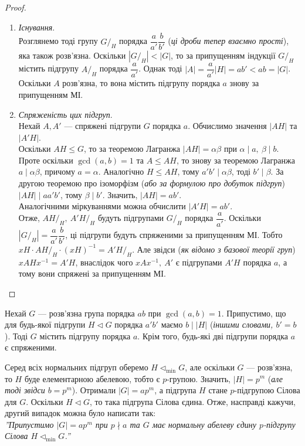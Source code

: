 \documentclass{math_library}
\begin{document}
\begin{proof}
\begin{enumerate}[topsep=0pt,wide=0pt,label={\roman*.}]
\item \textit{Існування}.\\
Розглянемо тоді групу $G/_H$ порядка $\dfrac{a}{a'} \dfrac{b}{b'}$ (\textit{ці дроби тепер взаємно прості}), яка також розв'язна. Оскільки $|G/_H| < |G|$, то за припущенням індукції $G/_H$ містить підгрупу $A/_H$ порядка $\dfrac{a}{a'}$. Однак тоді $|A| = \dfrac{a}{a'} |H| = ab' < ab = |G|$. Оскільки $A$ розв'язна, то вона містить підгрупу порядка $a$ знову за припущенням МІ.

\item \textit{Спряженість цих підгруп}.\\
Нехай $A,A'$ --- спряжені підгрупи $G$ порядка $a$. Обчислимо значення $|AH|$ та $|A'H|$.\\
Оскільки $AH \leq G$, то за теоремою Лагранжа $|AH| = \alpha \beta$ при $\alpha \mid a,\ \beta \mid b$. Проте оскільки $\gcd(a,b) = 1$ та $A \leq AH$, то знову за теоремою Лагранжа $a \mid \alpha \beta$, причому $a = \alpha$. Аналогічно $H \leq AH$, тому $a'b' \mid \alpha \beta$, тоді $b' \mid \beta$. За другою теоремою про ізоморфізм (\textit{або за формулою про добуток підгруп}) $|AH| \mid aa'b'$, тому $\beta \mid b'$. Значить, $|AH| = ab'$.\\
Аналогічними міркуваннями можна обчислити $|A'H| = ab'$.\\
Отже, $AH/_H,\ A'H/_H$ будуть підгрупами $G/_H$ порядка $\dfrac{a}{a'}$. Оскільки $|G/_H| = \dfrac{a}{a'} \dfrac{b}{b'}$, ці підгрупи будуть спряженими за припущенням МІ. Тобто $xH \cdot AH/_H \cdot (xH)^{-1} = A'H/_H$. Але звідси (\textit{як відомо з базової теорії груп}) $x AH x^{-1} = A'H$, внаслідок чого $xAx^{-1},\ A'$ є підгрупами $A'H$ порядка $a$, а тому вони спряжені за припущенням МІ. \qedhere
\end{enumerate}
\end{proof}

\begin{lemma}
Нехай $G$ --- розв'язна група порядка $ab$ при $\gcd(a,b) = 1$. Припустимо, що для будь-якої підгрупи $H \triangleleft G$ порядка $a'b'$ маємо $b \mid |H|$ (\textit{іншими словами, $b' = b$}). Тоді $G$ містить підгрупу порядка $a$. Крім того, будь-які дві підгрупи порядка $a$ є спряженими.
\end{lemma}

\begin{remark}
Серед всіх нормальних підгруп оберемо $H \triangleleft_{\text{min}} G$, але оскільки $G$ --- розв'язна, то $H$ буде елементарною абелевою, тобто є $p$-групою. Значить, $|H| = p^m$ (\textit{але тоді звідси $b = p^m$}). Отримали $|G| = ap^m$, а підгрупа $H$ стане $p$-підгрупою Сілова для $G$. Оскільки $H \triangleleft G$, то така підгрупа Сілова єдина. Отже, насправді кажучи, другий випадок можна було написати так:\\
\textit{''Припустимо $|G| = ap^m$ при $p \nmid a$ та $G$ має нормальну абелеву єдину $p$-підгрупу Сілова $H \triangleleft_{\text{min}} G$.''}
\end{remark}
\end{document}
